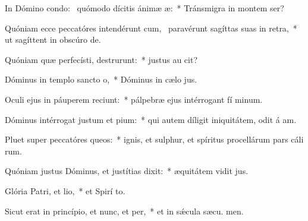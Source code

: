 \item In Dómino condo:~\pscross{} quómodo dícitis ánimæ æ:~* Tránsmigra in montem  ser?
\item Quóniam ecce peccatóres intendérunt cum,~\pscross{} paravérunt sagíttas suas in retra,~* ut sagíttent in obscúro  de.
\item Quóniam quæ perfecísti, destrurunt:~* justus au  cit?
\item Dóminus in templo sancto o,~* Dóminus in cælo  jus.
\item Oculi ejus in páuperem reciunt:~* pálpebræ ejus intérrogant fí minum.
\item Dóminus intérrogat justum et pium:~* qui autem díligit iniquitátem, odit á am.
\item Pluet super peccatóres queos:~* ignis, et sulphur, et spíritus procellárum pars cáli rum.
\item Quóniam justus Dóminus, et justítias dixit:~* æquitátem vidit  jus.
\item Glória Patri, et lio,~* et Spirí to.
\item Sicut erat in princípio, et nunc, et per,~* et in sǽcula sæcu. men.
